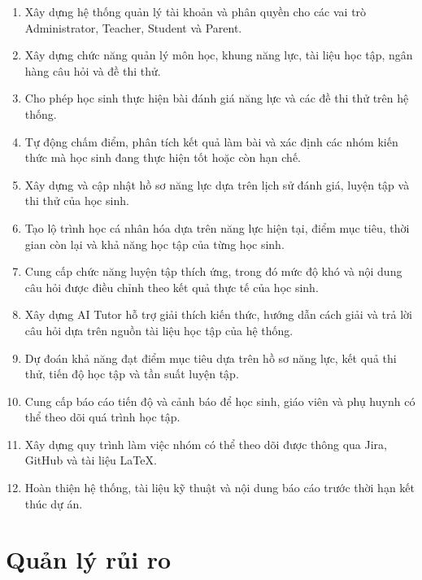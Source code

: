 \begin{enumerate}
	\item Xây dựng hệ thống quản lý tài khoản và phân quyền cho các vai trò
	Administrator, Teacher, Student và Parent.
	
	\item Xây dựng chức năng quản lý môn học, khung năng lực, tài liệu học
	tập, ngân hàng câu hỏi và đề thi thử.
	
	\item Cho phép học sinh thực hiện bài đánh giá năng lực và các đề thi
	thử trên hệ thống.
	
	\item Tự động chấm điểm, phân tích kết quả làm bài và xác định các nhóm
	kiến thức mà học sinh đang thực hiện tốt hoặc còn hạn chế.
	
	\item Xây dựng và cập nhật hồ sơ năng lực dựa trên lịch sử đánh giá,
	luyện tập và thi thử của học sinh.
	
	\item Tạo lộ trình học cá nhân hóa dựa trên năng lực hiện tại, điểm mục
	tiêu, thời gian còn lại và khả năng học tập của từng học sinh.
	
	\item Cung cấp chức năng luyện tập thích ứng, trong đó mức độ khó và
	nội dung câu hỏi được điều chỉnh theo kết quả thực tế của học sinh.
	
	\item Xây dựng AI Tutor hỗ trợ giải thích kiến thức, hướng dẫn cách
	giải và trả lời câu hỏi dựa trên nguồn tài liệu học tập của hệ thống.
	
	\item Dự đoán khả năng đạt điểm mục tiêu dựa trên hồ sơ năng lực,
	kết quả thi thử, tiến độ học tập và tần suất luyện tập.
	
	\item Cung cấp báo cáo tiến độ và cảnh báo để học sinh, giáo viên và
	phụ huynh có thể theo dõi quá trình học tập.
	
	\item Xây dựng quy trình làm việc nhóm có thể theo dõi được thông qua
	Jira, GitHub và tài liệu LaTeX.
	
	\item Hoàn thiện hệ thống, tài liệu kỹ thuật và nội dung báo cáo trước
	thời hạn kết thúc dự án.
\end{enumerate}

 \section{Quản lý rủi ro}

